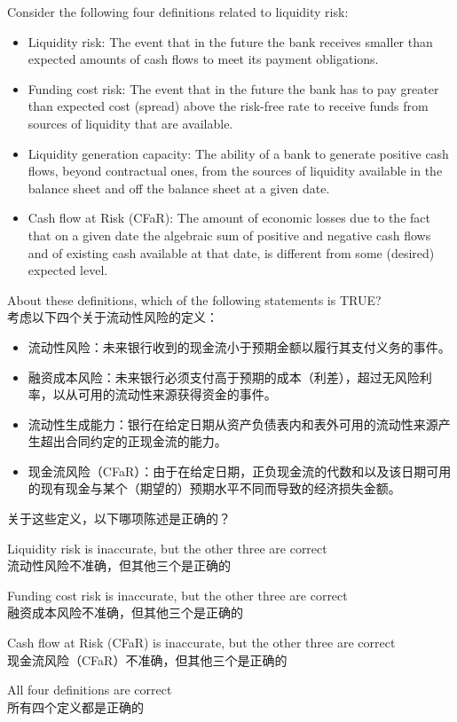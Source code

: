 \documentclass{article}
\newcounter{question} %
\begin{document}
\begin{question}
    Consider the following four definitions related to liquidity risk:
    \begin{itemize}
        \item Liquidity risk: The event that in the future the bank receives smaller than expected amounts of cash flows to meet its payment obligations.
        \item Funding cost risk: The event that in the future the bank has to pay greater than expected cost (spread) above the risk-free rate to receive funds from sources of liquidity that are available.
        \item Liquidity generation capacity: The ability of a bank to generate positive cash flows, beyond contractual ones, from the sources of liquidity available in the balance sheet and off the balance sheet at a given date.
        \item Cash flow at Risk (CFaR): The amount of economic losses due to the fact that on a given date the algebraic sum of positive and negative cash flows and of existing cash available at that date, is different from some (desired) expected level.
    \end{itemize}
    About these definitions, which of the following statements is TRUE?
    \\ 考虑以下四个关于流动性风险的定义：
    \begin{itemize}
        \item 流动性风险：未来银行收到的现金流小于预期金额以履行其支付义务的事件。
        \item 融资成本风险：未来银行必须支付高于预期的成本（利差），超过无风险利率，以从可用的流动性来源获得资金的事件。
        \item 流动性生成能力：银行在给定日期从资产负债表内和表外可用的流动性来源产生超出合同约定的正现金流的能力。
        \item 现金流风险（CFaR）：由于在给定日期，正负现金流的代数和以及该日期可用的现有现金与某个（期望的）预期水平不同而导致的经济损失金额。
    \end{itemize}
    关于这些定义，以下哪项陈述是正确的？
\end{question}

\begin{choices}
    \item Liquidity risk is inaccurate, but the other three are correct\\
    流动性风险不准确，但其他三个是正确的
    \item Funding cost risk is inaccurate, but the other three are correct\\
    融资成本风险不准确，但其他三个是正确的
    \item Cash flow at Risk (CFaR) is inaccurate, but the other three are correct\\
    现金流风险（CFaR）不准确，但其他三个是正确的
    \item All four definitions are correct\\
    所有四个定义都是正确的
\end{choices}
\end{document}
